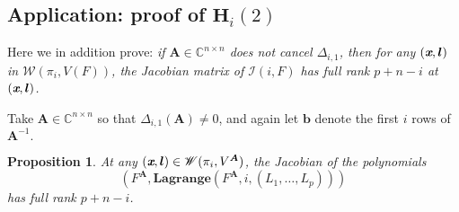 \documentclass[a4paper]{article}
\def\A{\mathfrak{A}}
\def\mA{{\bm A}}
\def\lb{{\bm l}}
\def\xb{\textit{\textbf{x}}}
\def\D{\Delta}
\def\C{\mathbb{C}}
\def\lagFA{{\bm{Lagrange}}(F^{\mA},i,(L_1,\hdots,L_p))}
\def\WilAnu{\mathscr{W}(\pi_i,V^{\mA})}
\newtheorem{prop}[theorem]{Proposition}
\begin{document}
%






\subsection{Application: proof of $\textbf{H}_i(2)$}\label{Hi2}
Here we in addition prove: \textit{if $\mA
    \in \C^{n\times n}$ does not cancel $\D_{i,1}$, then for any $(\xb,\lb)$ in $\mathscr{W}(\pi_i,V(F))$, the Jacobian matrix of $\mathscr{I}(i,F)$ has full rank $p+n-i$ at $(\xb,\lb)$.}    
    \par 
    Take $\mA \in \C^{n \times n}$ so that $\Delta_{i,1}(\mA) \not = 0$, and again let $\bm b$ denote the first $i$ rows of $\mA^{-1}.$
    \begin{prop}\label{prop:LagIdeal}
    At any $(\xb,\lb) \in \WilAnu$, the Jacobian of the polynomials 
    \[
    \left(F^{\mA},\lagFA\right)
    \]
    has full rank $p+n-i$. 
    \end{prop}
\end{document}
